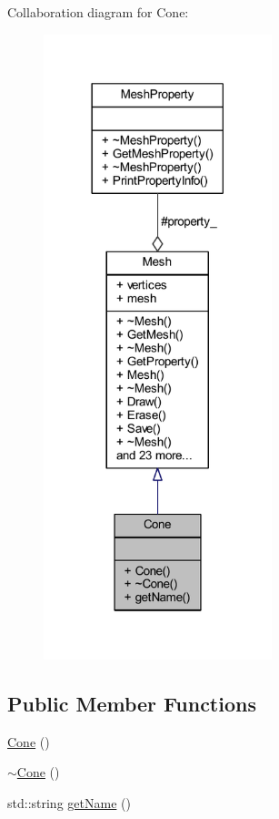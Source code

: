 Collaboration diagram for Cone\+:
\nopagebreak
\begin{figure}[H]
\begin{center}
\leavevmode
\includegraphics[width=188pt]{class_cone__coll__graph}
\end{center}
\end{figure}
\subsection*{Public Member Functions}
\begin{DoxyCompactItemize}
\item 
\mbox{\hyperlink{class_cone_aec709e915b3271a750d420b14b215bfb}{Cone}} ()
\item 
\mbox{\hyperlink{class_cone_a36a6a946043f7b24a34e42cb88b5a4e8}{$\sim$\+Cone}} ()
\item 
std\+::string \mbox{\hyperlink{class_cone_a9581010134e3d1fe079fe5cce1933786}{get\+Name}} ()
\end{DoxyCompactItemize}
